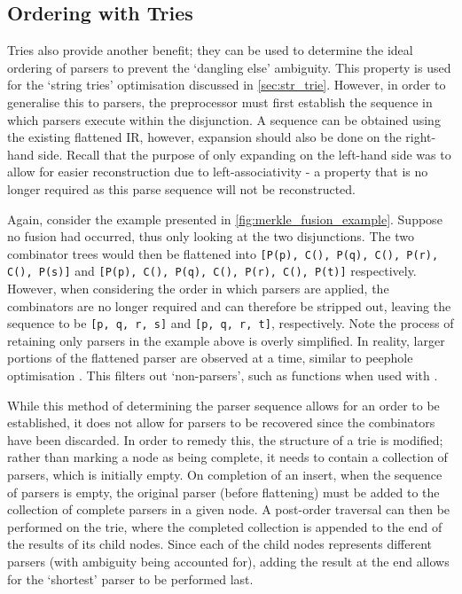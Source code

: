 \subsection{Ordering with Tries}
Tries also provide another benefit; they can be used to determine the ideal ordering of parsers to prevent the `dangling else' ambiguity.
This property is used for the `string tries' optimisation discussed in \autoref{sec:str_trie}.
However, in order to generalise this to parsers, the preprocessor must first establish the sequence in which parsers execute within the disjunction.
A sequence can be obtained using the existing flattened IR, however, expansion should also be done on the right-hand side.
Recall that the purpose of only expanding on the left-hand side was to allow for easier reconstruction due to left-associativity - a property that is no longer required as this parse sequence will not be reconstructed.

Again, consider the example presented in \autoref{fig:merkle_fusion_example}.
Suppose no fusion had occurred, thus only looking at the two disjunctions.
The two combinator trees would then be flattened into \texttt{[P(p), C(\ap), P(q), C(\ap), P(r), C(\mult), P(s)]} and \texttt{[P(p), C(\ap), P(q), C(\ap), P(r), C(\mult), P(t)]} respectively.
However, when considering the order in which parsers are applied, the combinators are no longer required and can therefore be stripped out, leaving the sequence to be \texttt{[p, q, r, s]} and \texttt{[p, q, r, t]}, respectively.
Note the process of retaining only parsers in the example above is overly simplified.
In reality, larger portions of the flattened parser are observed at a time, similar to peephole optimisation \cite{mckeeman65}.
This filters out `non-parsers', such as functions when used with \texttt{\fmap}.

While this method of determining the parser sequence allows for an order to be established, it does not allow for parsers to be recovered since the combinators have been discarded.
In order to remedy this, the structure of a trie is modified; rather than marking a node as being complete, it needs to contain a collection of parsers, which is initially empty.
On completion of an insert, when the sequence of parsers is empty, the original parser (before flattening) must be added to the collection of complete parsers in a given node.
A post-order traversal can then be performed on the trie, where the completed collection is appended to the end of the results of its child nodes.
Since each of the child nodes represents different parsers (with ambiguity being accounted for), adding the result at the end allows for the `shortest' parser to be performed last.

